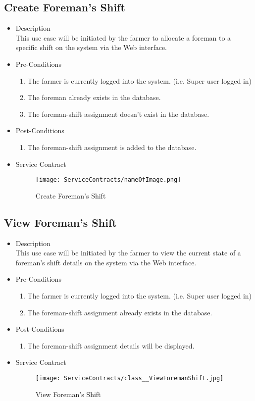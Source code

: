 \documentclass[11pt,fleqn]{book} %
\begin{document}
\subsection{Create Foreman’s Shift}
\begin{itemize}
	\item Description\\
	This use case will be initiated by the farmer to allocate a foreman to a specific shift on the system via the Web interface.
	\item Pre-Conditions
	\begin{enumerate}
		\item The farmer is currently logged into the system. (i.e. Super user logged in)
		\item The foreman already exists in the database. 
		\item The foreman-shift assignment doesn’t exist in the database.					
	\end{enumerate}
	\item Post-Conditions
	\begin{enumerate}
		\item The foreman-shift assignment is added to the database.
	\end{enumerate}
	\item Service Contract
	\begin{figure}
		\texttt{[image: ServiceContracts/nameOfImage.png]}
		\caption{Create Foreman’s Shift}
	\end{figure}
\end{itemize}

\subsection{View Foreman’s Shift}
\begin{itemize}
	\item Description\\
	This use case will be initiated by the farmer to view the current state of a foreman’s shift details on the system via the Web interface.
	\item Pre-Conditions
	\begin{enumerate}
		\item The farmer is currently logged into the system. (i.e. Super user logged in)
		\item The foreman-shift assignment already exists in the database.		
	\end{enumerate}
	\item Post-Conditions
	\begin{enumerate}
		\item The foreman-shift assignment details will be displayed.
	\end{enumerate}
	\item Service Contract
		\begin{figure}
			\texttt{[image: ServiceContracts/class\_\_ViewForemanShift.jpg]}
			\caption{View Foreman’s Shift}
		\end{figure}
\end{itemize}
\end{document}
